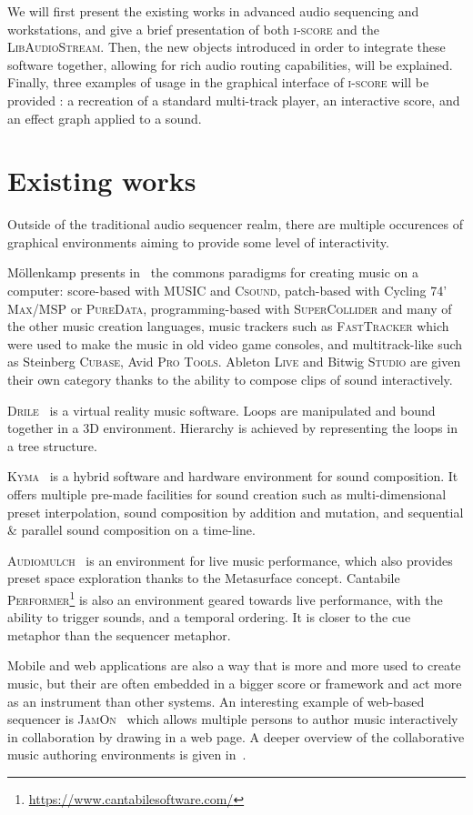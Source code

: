 \documentclass{article}
\newcommand*{\LibAudioStream}{\textsc{LibAudioStream}\xspace}
\newcommand*{\iscore}{\textsc{i-score}\xspace}
\newcommand*{\maxmsp}{Cycling 74' \textsc{Max/MSP}\xspace}
\newcommand*{\puredata}{\textsc{PureData}\xspace}
\newcommand*{\csound}{\textsc{Csound}\xspace}
\newcommand*{\supercollider}{\textsc{SuperCollider}\xspace}
\newcommand*{\abletonlive}{Ableton \textsc{Live}\xspace}
\newcommand*{\bitwigstudio}{Bitwig \textsc{Studio}\xspace}
\newcommand*{\fasttracker}{\textsc{FastTracker}\xspace}
\newcommand*{\cubase}{Steinberg \textsc{Cubase}\xspace}
\newcommand*{\protools}{Avid \textsc{Pro Tools}\xspace}
\newcommand*{\MUSIC}{\textsc{MUSIC}\xspace}
\newcommand*{\drile}{\textsc{Drile}\xspace}
\newcommand*{\jamon}{\textsc{JamOn}\xspace}
\newcommand*{\kyma}{\textsc{Kyma}\xspace}
\newcommand*{\audiomulch}{\textsc{Audiomulch}\xspace}
\newcommand*{\cantabileperformer}{Cantabile \textsc{Performer}\xspace}
\begin{document}
We will first present the existing works in advanced audio sequencing and workstations, 
and give a brief presentation of both \iscore and the \LibAudioStream.
Then, the new objects introduced in order to integrate these software together, allowing 
for rich audio routing capabilities, will be explained.
Finally, three examples of usage in the graphical interface of \iscore will be provided : a recreation of a standard multi-track player, an interactive score, and an effect graph applied to a sound.

\section{Existing works}
Outside of the traditional audio sequencer realm, there are
multiple occurences of graphical environments aiming to provide 
some level of interactivity.

M{\"o}llenkamp presents in~\cite{mollenkampparadigms} the 
commons paradigms for creating music on a computer: score-based with \MUSIC and \csound, 
patch-based with \maxmsp or \puredata, programming-based with \supercollider and many of the other music creation languages, music trackers such as \fasttracker which were used to make the music in old video game consoles, and multitrack-like such as \cubase, \protools.
\abletonlive and \bitwigstudio are given their own category thanks to the ability to compose clips of sound interactively.

\drile~\cite{berthaut2010drile} is a virtual reality music software. 
Loops are manipulated and bound together in a 3D environment. 
Hierarchy is achieved by representing the loops in a tree structure.

\kyma~\cite{scaletti1989kyma} is a hybrid software and hardware environment for sound composition. 
It offers multiple pre-made facilities for sound creation such as multi-dimensional preset interpolation, sound composition by addition and mutation, and sequential \& parallel sound composition on a time-line.

\audiomulch~\cite{bencina2005metasurface} is an environment for live music performance, which also provides preset space exploration thanks to the Metasurface concept. 
\cantabileperformer\footnote{\url{https://www.cantabilesoftware.com/}} is also an environment geared towards live performance, with the ability to trigger sounds, and a temporal ordering. It is closer to the cue metaphor than the sequencer metaphor.

Mobile and web applications are also a way that is more and more used to create music, 
but their are often embedded in a bigger score or framework and act more as an instrument than other systems.
An interesting example of web-based sequencer is \jamon~\cite{rosselet2013jam} which allows multiple persons to author music interactively in collaboration by drawing in a web page.
A deeper overview of the collaborative music authoring environments is given in~\cite{fencott2013computer}.
\end{document}
